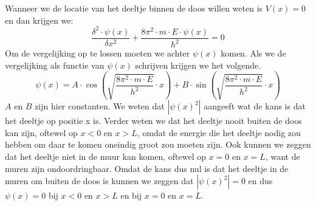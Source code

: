 \documentclass[11pt,fleqn]{book} %
\begin{document}
Wanneer we de locatie van het deeltje binnen de doos willen weten is $V(x)=0$ en dan krijgen we:
\begin{displaymath}
\frac{\delta^2\cdot\psi(x)}{\delta x^2}+\frac{8\pi^2\cdot m\cdot E\cdot\psi(x)}{h^2} = 0
\end{displaymath}
Om de vergelijking op te lossen moeten we achter $\psi(x)$ komen. Als we de vergelijking als functie van $\psi(x)$ schrijven krijgen we het volgende.
\begin{displaymath}
\psi(x)=A\cdot \cos{\left(\sqrt{\frac{8\pi^2\cdot m\cdot E}{h^2}}\cdot x\right)}+B\cdot\sin{\left(\sqrt{\frac{8\pi^2\cdot m\cdot E}{h^2}}\cdot x\right)}
\end{displaymath}
$A$ en $B$ zijn hier constanten. We weten dat $\left|{\psi(x)}^2\right|$ aangeeft wat de kans is dat het deeltje op positie x is. Verder weten we dat het deeltje nooit buiten de doos kan zijn, oftewel op $x<0$ en $x>L$, omdat de energie die het deeltje nodig zou hebben om daar te komen oneindig groot zou moeten zijn. Ook kunnen we zeggen dat het deeltje niet in de muur kan komen, oftewel op $x=0$ en $x=L$, want de muren zijn ondoordringbaar. Omdat de kans dus nul is dat het deeltje in de muren om buiten de doos is kunnen we zeggen dat $\left|{\psi(x)}^2\right| = 0$ en dus $\psi(x)=0$ bij $x<0$ en $x>L$ en bij $x=0$ en $x=L$.
\end{document}
